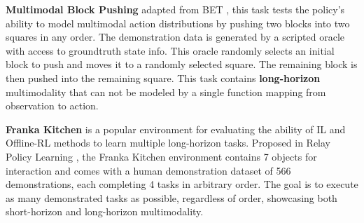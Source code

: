 \documentclass[Afour,sageh,times]{sagej}
\begin{document}
\textbf{Multimodal Block Pushing} adapted from BET \cite{bet}, this task tests the policy's ability to model multimodal action distributions by pushing two blocks into two squares in any order. The demonstration data is generated by a scripted oracle with access to groundtruth state info. This oracle randomly selects an initial block to push and moves it to a randomly selected square. The remaining block is then pushed into the remaining square. This task contains \textbf{long-horizon} multimodality that can not be modeled by a single function mapping from observation to action.

\textbf{Franka Kitchen} is a popular environment for evaluating the ability of IL and Offline-RL methods to learn multiple long-horizon tasks. Proposed in Relay Policy Learning \cite{gupta2019relay}, the Franka Kitchen environment contains 7 objects for interaction and comes with a human demonstration dataset of 566 demonstrations, each completing 4 tasks in arbitrary order. The goal is to execute as many demonstrated tasks as possible, regardless of order, showcasing both short-horizon and long-horizon multimodality.
\end{document}
